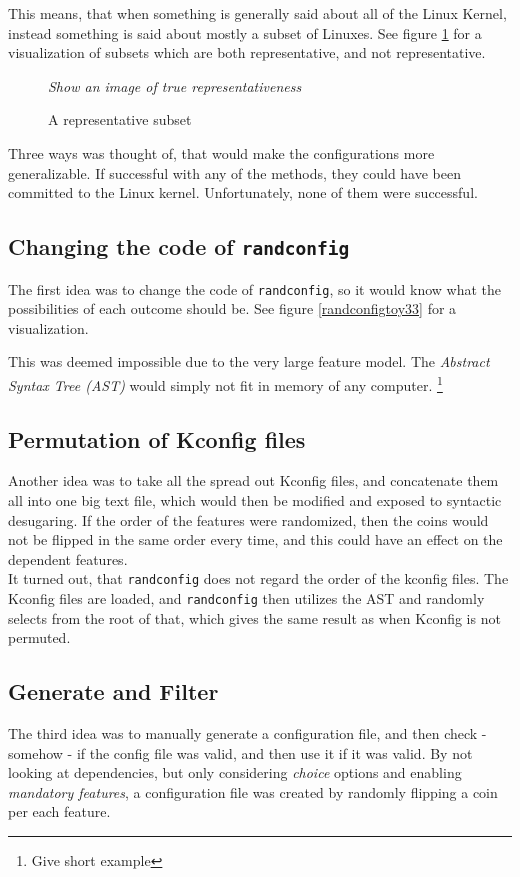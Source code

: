 \documentclass[a4paper,11pt]{report}
\newcommand{\figa}{
    \begin{figure}[!htpb]
    \centering
}
\newcommand{\figb}[2]{
    \caption{#1}
    \label{#2}
    \end{figure}
}
\begin{document}
This means, that when something is generally said about all of the Linux 
Kernel, instead something is said about mostly a subset of Linuxes. See figure 
\ref{fig:repsubset} for a visualization of subsets which are both 
representative, and not representative.

\figa
    \emph{Show an image of true representativeness}
\figb{A representative subset}{fig:repsubset}

Three ways was thought of, that would make the configurations more 
generalizable. If successful with any of the methods, they could have been 
committed to the Linux kernel. Unfortunately, none of them were successful.


    \subsection*{Changing the code of \texttt{randconfig}}
The first idea was to change the code of \texttt{randconfig}, so it would know
what the possibilities of each outcome should be. See figure 
\ref{randconfigtoy33} for a visualization.

This was deemed impossible due to the very large feature model. The 
\emph{Abstract Syntax Tree (AST)} would simply not fit in memory of any 
computer.
    \footnote{Give short example}


    \subsection*{Permutation of Kconfig files}
Another idea was to take all the spread out Kconfig files, and concatenate 
them all into one big text file, which would then be modified and exposed to 
syntactic desugaring. If the order of the features were randomized, then the 
coins would not be flipped in the same order every time, and this could have an 
effect on the dependent features. 
\\

It turned out, that \texttt{randconfig} does not regard the order of the 
kconfig files. The Kconfig files are loaded, and \texttt{randconfig} then 
utilizes the AST and randomly selects from the root of that, which gives the
same result as when Kconfig is not permuted.


    \subsection*{Generate and Filter}
The third idea was to manually generate a configuration file, and then check - 
somehow - if the config file was valid, and then use it if it was valid. By 
not looking at dependencies, but only considering \emph{choice} options and 
enabling \emph{mandatory features}, a configuration file was created by 
randomly flipping a coin per each feature.
\end{document}
